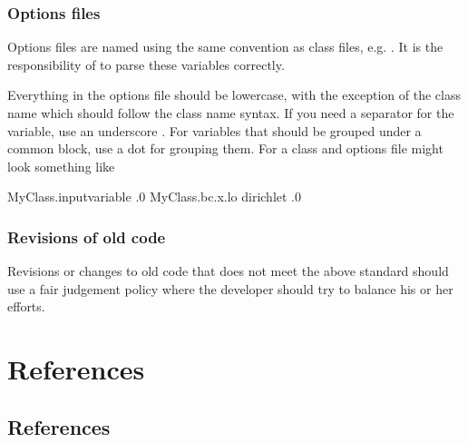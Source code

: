 \documentclass[letterpaper,10pt,english]{sphinxmanual}
\begin{document}
\begin{sphinxVerbatim}[commandchars=\\\{\},formatcom=\scriptsize]

\end{sphinxVerbatim}


\subsection{Options files}
\label{\detokenize{Contrib/CodeStandard:options-files}}
Options files are named using the same convention as class files, e.g. .
It is the responsibility of  to parse these variables correctly.

Everything in the options file should be lower\sphinxhyphen{}case, with the exception of the class name which should follow the class name syntax.
If you need a separator for the variable, use an underscore \sphinxcode{\sphinxupquote{\_}}.
For variables that should be grouped under a common block, use a dot  for grouping them.
For a class  and options file might look something like

\begin{sphinxVerbatim}[commandchars=\\\{\},formatcom=\scriptsize]
MyClass.input\PYGZus{}variable  .0
MyClass.bc.x.lo         dirichlet .0
\end{sphinxVerbatim}


\subsection{Revisions of old code}
\label{\detokenize{Contrib/CodeStandard:revisions-of-old-code}}
Revisions or changes to old code that does not meet the above standard should use a fair judgement policy where the developer should try to balance his or her efforts.


\chapter{References}
\label{\detokenize{index:references}}

\section{References}
\label{\detokenize{ZZReferences:references}}\label{\detokenize{ZZReferences::doc}}
\end{document}
